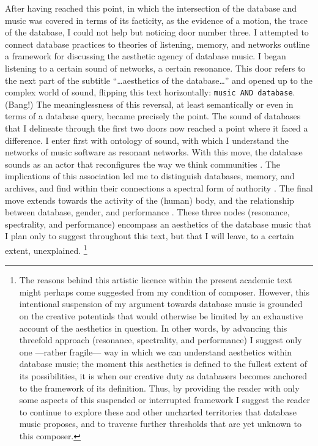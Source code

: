 After having reached this point, in which the intersection of the database and music was covered in terms of its facticity, as the evidence of a motion, the trace of the database, I could not help but noticing door number three.  I attempted to connect database practices to theories of listening, memory, and networks outline a framework for discussing the aesthetic agency of database music. I began listening to a certain sound of networks, a certain resonance. This door refers to the next part of the subtitle ``\dots aesthetics of the database\dots'' and opened up to the complex world of sound, flipping this text horizontally: \texttt{music AND database}. (Bang!) The meaninglessness of this reversal, at least semantically or even in terms of a database query, became precisely the point. The sound of databases that I delineate through the first two doors now reached a point where it faced a difference. I enter first with  ontology of sound, with which I understand the networks of music software as resonant networks. With this move, the database sounds as an actor \parencite{Lat90:On} that reconfigures the way we think communities \parencite{Nan91:The}. The implications of this association led me to distinguish databases, memory, and archives, and find within their connections a spectral form of authority \parencites{Der78:Wri}{Der95:Arc}. The final move extends towards the activity of the (human) body, and the relationship between database, gender, and performance \parencite{But88:Per}. These three nodes (resonance, spectrality, and performance) encompass an aesthetics of the database music that I plan only to suggest throughout this text, but that I will leave, to a certain extent, unexplained. \footnote{The reasons behind this artistic licence within the present academic text might perhaps come suggested from my condition of composer. However, this intentional suspension of my argument towards database music is grounded on the creative potentials that would otherwise be limited by an exhaustive account of the aesthetics in question. In other words, by advancing this threefold approach (resonance, spectrality, and performance) I suggest only one ---rather fragile--- way in which we can understand aesthetics within database music; the moment this aesthetics is defined to the fullest extent of its possibilities, it is when our creative duty as databasers becomes anchored to the framework of its definition. Thus, by providing the reader with only some aspects of this suspended or interrupted framework I suggest the reader to continue to explore these and other uncharted territories that database music proposes, and to traverse further thresholds that are yet unknown to this composer.}

